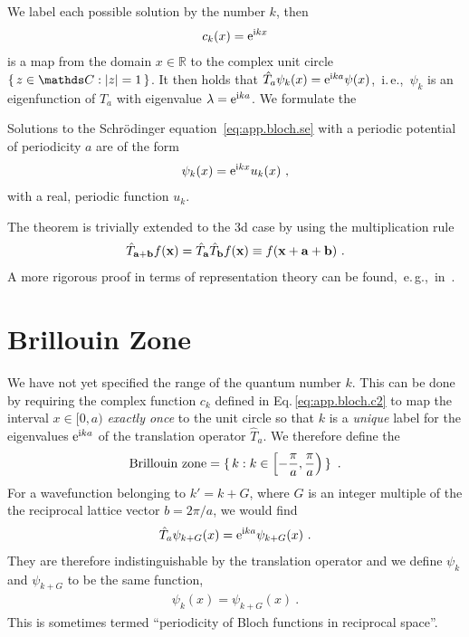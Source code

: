 We label each possible solution by the number $k$, then
\begin{align}
	c_k (x) = {\rm e}^{\im k x}
	\label{eq:app.bloch.c2}
\end{align}
is a map from the domain $x \in \mathds R$ to the complex unit circle $\set{z \in \mathds C : \lvert z \rvert = 1}$. 
It then holds that $\hat T_a \psi_k (x) = {\rm e}^{{\rm i} k a} \psi(x)$,~i.\,e.,~$\psi_k$ is an eigenfunction of $\hat T_a$ with eigenvalue $\lambda = {\rm e}^{{\rm i} k a}$. We formulate the
\begin{thm}[Bloch]
	Solutions to the Schr\"odinger equation~\eqref{eq:app.bloch.se} with a periodic potential of periodicity $a$ are of the form
	\begin{align*}
		\psi_k (x) = {\rm e}^{{\rm i} k x} u_k (x)~,
	\end{align*}
	with a real, periodic function $u_k$.
\end{thm}
The theorem is trivially extended to the 3d case by using the multiplication rule
\begin{align}
	\hat{T}_{{\bf a} + {\bf b}} f({\bf x}) = \hat{T}_{\bf a} \hat{T}_{\bf b} f({\bf x}) \equiv f({\bf x} + {\bf a} + {\bf b})~.
\end{align}
A more rigorous proof in terms of representation theory can be found,~e.\,g.,~in~\cite{Dresselhaus2007}.

\section{Brillouin Zone}
\label{sec:BrillouinZone}
We have not yet specified the range of the quantum number $k$. This can be done by requiring the complex function $c_k$ defined in Eq.\,\eqref{eq:app.bloch.c2} to map the interval $x \in [0, a)$ \emph{exactly once} to the unit circle so that $k$ is a \emph{unique} label for the eigenvalues ${\rm e}^{{\rm i} k a}$ of the translation operator $\hat T_a$.
We therefore define the
\begin{align}
	\text{Brillouin zone} = \set{k : k \in \left[ - \frac{\pi}{a}, \frac{\pi}{a}\right)}~.
\end{align}
For a wavefunction belonging to $k' = k + G$, where $G$ is an integer multiple of the the reciprocal lattice vector $b = 2\pi / a$, we would find
\begin{align}
	\hat T_a \psi_{k + G} (x) = {\rm e}^{{\rm i} k a} \psi_{k + G} (x)~.
\end{align}
They are therefore indistinguishable by the translation operator and we define $\psi_k$ and $\psi_{k+G}$ to be the same function,
\begin{align}
	\psi_k (x) = \psi_{k + G} (x)~.
\end{align}
This is sometimes termed ``periodicity of Bloch functions in reciprocal space''.

